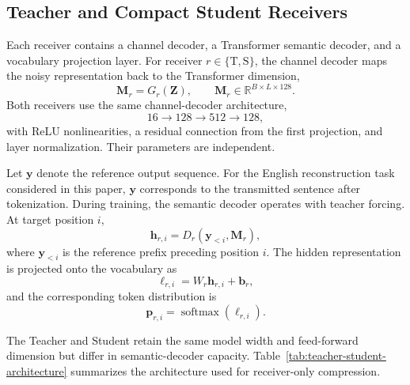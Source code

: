 \documentclass[conference]{IEEEtran}
\begin{document}
\subsection{Teacher and Compact Student Receivers}
Each receiver contains a channel decoder, a Transformer semantic decoder, and a vocabulary projection layer. For receiver $r\in\{\mathrm{T},\mathrm{S}\}$, the channel decoder maps the noisy representation back to the Transformer dimension,
\begin{equation}
    \mathbf{M}_r=G_r(\mathbf{Z}),
    \qquad
    \mathbf{M}_r\in\mathbb{R}^{B\times L\times128}.
\end{equation}
Both receivers use the same channel-decoder architecture,
\begin{equation}
    16 \rightarrow 128 \rightarrow 512 \rightarrow 128,
\end{equation}
with ReLU nonlinearities, a residual connection from the first projection, and layer normalization. Their parameters are independent.

Let $\mathbf{y}$ denote the reference output sequence. For the English reconstruction task considered in this paper, $\mathbf{y}$ corresponds to the transmitted sentence after tokenization. During training, the semantic decoder operates with teacher forcing. At target position $i$,
\begin{equation}
    \mathbf{h}_{r,i}
    =D_r\!\left(\mathbf{y}_{<i},\mathbf{M}_r\right),
\end{equation}
where $\mathbf{y}_{<i}$ is the reference prefix preceding position $i$. The hidden representation is projected onto the vocabulary as
\begin{equation}
    \boldsymbol{\ell}_{r,i}
    =W_r\mathbf{h}_{r,i}+\mathbf{b}_r,
\end{equation}
and the corresponding token distribution is
\begin{equation}
    \mathbf{p}_{r,i}
    =\operatorname{softmax}\!\left(\boldsymbol{\ell}_{r,i}\right).
\label{eq:receiver-probability}
\end{equation}

The Teacher and Student retain the same model width and feed-forward dimension but differ in semantic-decoder capacity. Table~\ref{tab:teacher-student-architecture} summarizes the architecture used for receiver-only compression.
\end{document}
